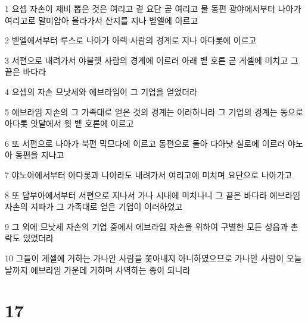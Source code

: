 \par 1 요셉 자손이 제비 뽑은 것은 여리고 곁 요단 곧 여리고 물 동편 광야에서부터 나아가 여리고로 말미암아 올라가서 산지를 지나 벧엘에 이르고
\par 2 벧엘에서부터 루스로 나아가 아렉 사람의 경계로 지나 아다롯에 이르고
\par 3 서편으로 내려가서 야블렛 사람의 경계에 이르러 아래 벧 호론 곧 게셀에 미치고 그 끝은 바다라
\par 4 요셉의 자손 므낫세와 에브라임이 그 기업을 얻었더라
\par 5 에브라임 자손의 그 가족대로 얻은 것의 경계는 이러하니라 그 기업의 경계는 동으로 아다롯 앗달에서 윗 벧 호론에 이르고
\par 6 또 서편으로 나아가 북편 믹므다에 이르고 동편으로 돌아 다아낫 실로에 이르러 야노아 동편을 지나고
\par 7 야노아에서부터 아다롯과 나아라도 내려가서 여리고에 미치며 요단으로 나아가고
\par 8 또 답부아에서부터 서편으로 지나서 가나 시내에 미치나니 그 끝은 바다라 에브라임 자손의 지파가 그 가족대로 얻은 기업이 이러하였고
\par 9 그 외에 므낫세 자손의 기업 중에서 에브라임 자손을 위하여 구별한 모든 성읍과 촌락도 있었더라
\par 10 그들이 게셀에 거하는 가나안 사람을 쫓아내지 아니하였으므로 가나안 사람이 오늘날까지 에브라임 가운데 거하며 사역하는 종이 되니라

\chapter{17}

